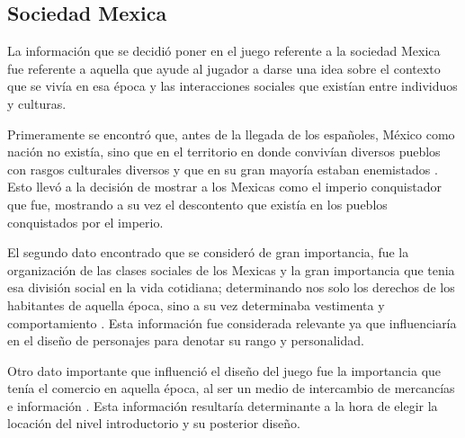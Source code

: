 	\subsection{Sociedad Mexica}
	La información que se decidió poner en el juego referente a la sociedad Mexica 
	fue referente a aquella que ayude al jugador a darse una idea sobre el contexto 
	que se vivía en esa época y las interacciones sociales que existían entre 
	individuos y culturas. 
	\\
	\par		
	Primeramente se encontró que, antes de la llegada de los españoles, México como 
	nación no existía, sino que en el territorio en donde convivían diversos pueblos 
	con rasgos culturales diversos y que en su gran mayoría estaban enemistados
	\cite{RefMexicasMito}. Esto llevó a la decisión de mostrar a los Mexicas como el 
	imperio conquistador que fue, mostrando a su vez el descontento que existía en los 
	pueblos conquistados por el imperio.
	\\
	\par
	 El segundo dato encontrado que se consideró de gran importancia, fue la 
	 organización de las clases sociales de los Mexicas y la gran importancia que 
	 tenia esa división social en la vida cotidiana; determinando nos solo los 
	 derechos de los habitantes de aquella época, sino a su vez determinaba vestimenta 
	 y comportamiento \cite{RefCivilAztea}. Esta información fue considerada relevante 
	 ya que influenciaría en el diseño de personajes para denotar su rango y 
	 personalidad.
	 \\
	 \par
	 Otro dato importante que influenció el diseño del juego fue la importancia que 
	 tenía el comercio en aquella época, al ser un medio de intercambio de mercancías
	 e información \cite{RefMexicasMito}. Esta información resultaría determinante a la 
	 hora de elegir la locación del nivel introductorio y su posterior diseño.
	 
